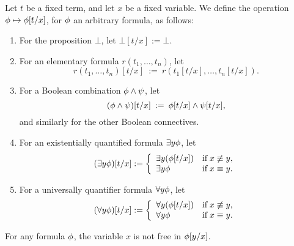 \begin{defn} Let $t$ be a fixed term, and let $x$ be a fixed variable.
  We define the operation $\phi\mapsto \phi [t/x]$, for $\phi$ an
  arbitrary formula, as follows:
  \begin{enumerate}
  \item For the proposition $\bot$, let $\bot [t/x]:=\bot$.
  \item For an elementary formula $r(t_1,\dots ,t_n)$, let 
    \[ r(t_1,\dots ,t_n)[t/x] \: := \: r(t_1[t/x],\dots ,t_n[t/x]) .\]
  \item For a Boolean combination $\phi\wedge\psi$, let
    \[ (\phi\wedge\psi )[t/x] \: : = \: \phi [t/x]\wedge \psi [t/x] ,\]
    and similarly for the other Boolean connectives.
  \item For an existentially quantified formula $\exists y\phi$, let
    \[ (\exists y\phi )[t/x] := \left\{ \begin{array}{l l} \exists y(\phi
                                         [t/x]) & \text{if}\; x\not\equiv y , \\
                                         \exists y\phi & \text{if}\;
                                                        x\equiv y
                                                        .\end{array}
                                                    \right. \]
\item For a universally quantifier formula $\forall y\phi$, let \[ (\forall y\phi )[t/x] := \left\{ \begin{array}{l l}
                                                  \forall y(\phi
                                         [t/x]) & \text{if}\; x\not\equiv y , \\
                                         \forall y\phi & \text{if}\;
                                                        x\equiv y
                                                        .\end{array}
                                                    \right. \]
                                                  
\end{enumerate}
\end{defn}

\begin{prop} For any formula $\phi$, the variable $x$ is not free in
  $\phi [y/x]$. \end{prop}

